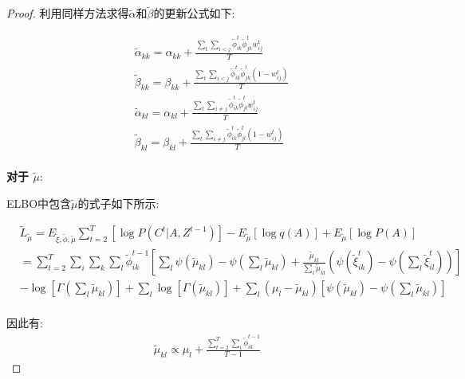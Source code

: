 \begin{proof}
	利用同样方法求得$\widetilde{\alpha}$和$\widetilde{\beta}$的更新公式如下:
	
	\begin{equation}
		\label{appendix:eq6}
		\begin{split}
			& \widetilde{\alpha}_{kk} = \alpha_{kk} + \frac{\sum_t \sum_{i<j} \widetilde{\phi}_{ik}^t \widetilde{\phi}_{jk}^t w_{ij}^t}{T}  \\
			& \widetilde{\beta}_{kk} = \beta_{kk} + \frac{\sum_t \sum_{i<j} \widetilde{\phi}_{ik}^t \widetilde{\phi}_{jk}^t (1-w_{ij}^t)}{T} \\
			& \widetilde{\alpha}_{kl} = \alpha_{kl} + \frac{\sum_t \sum_{i \neq j} \widetilde{\phi}_{ik}^t \widetilde{\phi}_{jl}^t w_{ij}^t}{T} \\
			& \widetilde{\beta}_{kl} = \beta_{kl} + \frac{\sum_t \sum_{i \neq j} \widetilde{\phi}_{ik}^t \widetilde{\phi}_{jl}^t (1-w_{ij}^t)}{T}  \\
		\end{split}
	\end{equation}
	
	\textbf{对于 $\widetilde{\mu}$}:
	
	ELBO中包含$\widetilde{\mu}$的式子如下所示:
	
	\begin{equation}
		\begin{split}
			& \widetilde{L}_{\widetilde{\mu}} = E_{\widetilde{\xi},\widetilde{\phi},\widetilde{\mu}} \sum_{t=2}^T [\log P(C^t|A,Z^{t-1})] 
			- E_{\widetilde{\mu}}[\log q(A)]+ E_{\widetilde{\mu}}[\log P(A)]\\
			&=\sum_{t=2}^T \sum_i \sum_k \sum_l \widetilde{\phi}_{ik}^{t-1} [\sum_l \psi(\widetilde{\mu}_{kl}) - \psi(\sum_l \widetilde{\mu}_{kl}) 
			+ \frac{\widetilde{\mu}_{kl}}{\sum_l \widetilde{\mu}_{kl}}(\psi(\widetilde{\xi}_{ik}^t)-\psi(\sum_l \widetilde{\xi}_{il}^t))]  \\
			&-\log[\Gamma(\sum_l \widetilde{\mu}_{kl})] + \sum_l \log[\Gamma(\widetilde{\mu}_{kl})]
			+ \sum_l (\mu_l - \widetilde{\mu}_{kl})[\psi(\widetilde{\mu}_{kl}) - \psi(\sum_l \widetilde{\mu}_{kl})]  \\
		\end{split}
	\end{equation}
	
	因此有:
	\begin{equation}
		\label{appendix:eq7}
		\begin{split}
			\widetilde{\mu}_{kl} \propto \mu_l + \frac{\sum_{t=2}^T \sum_i \widetilde{\phi}_{ik}^{t-1}}{T-1}
		\end{split}
	\end{equation}
	

\end{proof}
